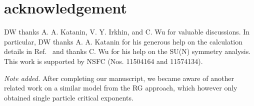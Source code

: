 \documentclass[aps,twocolumn,superscriptaddress]{revtex4-1}
\begin{document}
\section{acknowledgement}
DW thanks A. A. Katanin, V. Y. Irkhin, and C. Wu for valuable discussions. In particular, DW thanks A. A. Katanin for his generous help on the calculation details in Ref.~ and thanks C. Wu for his help on the SU(N) symmetry analysis. This work is supported by NSFC (Nos. 11504164 and 11574134).

{\it Note added.} After completing our manuscript, we became aware of another related work \cite{das2018} on a similar model from the RG approach, which however only obtained single particle critical exponents. 



\end{document}
